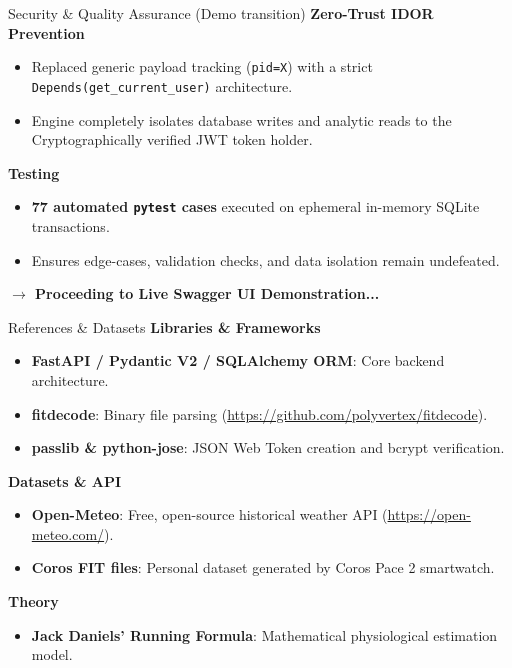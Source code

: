 \documentclass[mathserif,aspectratio=169]{beamer}
\begin{document}
\begin{frame}{Security \& Quality Assurance (Demo transition)}
    \textbf{Zero-Trust IDOR Prevention}
    \begin{itemize}
        \item Replaced generic payload tracking (\texttt{pid=X}) with a strict \texttt{Depends(get\_current\_user)} architecture.
        \item Engine completely isolates database writes and analytic reads to the Cryptographically verified JWT token holder.
    \end{itemize}

    \vspace{0.2cm}
    \textbf{Testing}
    \begin{itemize}
        \item \textbf{77 automated \texttt{pytest} cases} executed on ephemeral in-memory SQLite transactions.
        \item Ensures edge-cases, validation checks, and data isolation remain undefeated.
    \end{itemize}
    
    \vspace{0.4cm}
    \begin{center}
        \textbf{\large $\rightarrow$ Proceeding to Live Swagger UI Demonstration...}
    \end{center}
\end{frame}

\begin{frame}{References \& Datasets}
    \textbf{Libraries \& Frameworks}
    \begin{itemize}
        \item \textbf{FastAPI / Pydantic V2 / SQLAlchemy ORM}: Core backend architecture.
        \item \textbf{fitdecode}: Binary file parsing (\url{https://github.com/polyvertex/fitdecode}).
        \item \textbf{passlib \& python-jose}: JSON Web Token creation and bcrypt verification.
    \end{itemize}

    \vspace{0.2cm}
    \textbf{Datasets \& API}
    \begin{itemize}
        \item \textbf{Open-Meteo}: Free, open-source historical weather API (\url{https://open-meteo.com/}).
        \item \textbf{Coros FIT files}: Personal dataset generated by Coros Pace 2 smartwatch.
    \end{itemize}

    \vspace{0.2cm}
    \textbf{Theory}
    \begin{itemize}
        \item \textbf{Jack Daniels' Running Formula}: Mathematical physiological estimation model.
    \end{itemize}
\end{frame}
\end{document}
